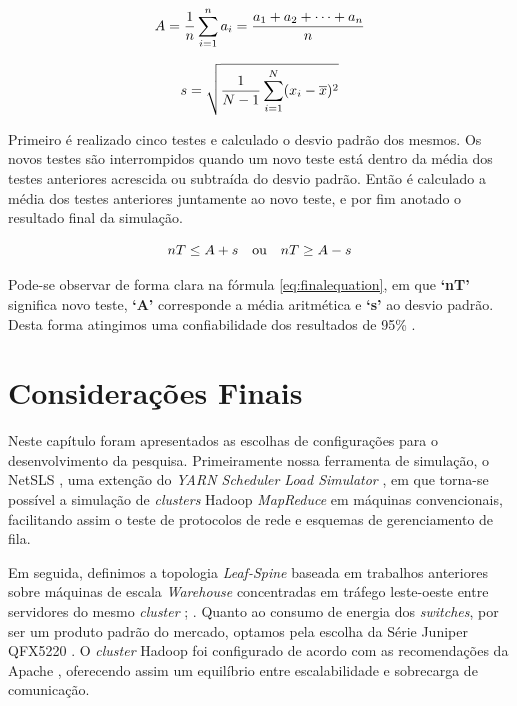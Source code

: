 \begin{equation}
\centering
{\displaystyle A={\frac {1}{n}}\sum _{i=1}^{n}a_{i}={\frac {a_{1}+a_{2}+\cdots +a_{n}}{n}}}
\label{eq:arithmeticmean}
\end{equation}

\begin{equation}
\centering
s = \sqrt{\frac{1}{N-1} \sum_{i=1}^N (x_i - \overline{x})^2}
\label{eq:standard_deviation}
\end{equation}

Primeiro é realizado cinco testes e calculado o desvio padrão dos mesmos. Os novos testes são interrompidos quando um novo teste está dentro da média dos testes anteriores acrescida ou subtraída do desvio padrão. Então é calculado a média dos testes anteriores juntamente ao novo teste, e por fim anotado o resultado final da simulação.

\begin{equation}
\centering
nT \leq A+s \quad \textrm{ou} \quad nT \geq A-s
\label{eq:finalequation}
\end{equation}

Pode-se observar de forma clara na fórmula \ref{eq:finalequation}, em que \textbf{`nT'} significa novo teste, \textbf{`A'} corresponde a média aritmética e \textbf{`s'} ao desvio padrão. Desta forma atingimos uma confiabilidade dos resultados de 95\% \cite{peck2015introduction}.

\section{Considerações Finais}

Neste capítulo foram apresentados as escolhas de configurações para o desenvolvimento da pesquisa. Primeiramente nossa ferramenta de simulação, o NetSLS \cite{wette2015extending}, uma extenção do \emph{YARN Scheduler Load Simulator} \cite{ApacheSLS}, em que torna-se possível a simulação de \emph{clusters} Hadoop \emph{MapReduce} em máquinas convencionais, facilitando assim o teste de protocolos de rede e esquemas de gerenciamento de fila.

Em seguida, definimos a topologia \emph{Leaf-Spine} \cite{CiscoLeafSpine} baseada em trabalhos anteriores sobre máquinas de escala \emph{Warehouse} concentradas em tráfego leste-oeste entre servidores do mesmo \emph{cluster} \cite{efficiency2012cisco}; \cite{IntroductionLeafSpine}. Quanto ao consumo de energia dos \emph{switches}, por ser um produto padrão do mercado, optamos pela escolha da Série Juniper QFX5220 \cite{QFX5220Guide}. O \emph{cluster} Hadoop foi configurado de acordo com as recomendações da Apache \cite{HDFSHighAvailability}, oferecendo assim um equilíbrio entre escalabilidade e sobrecarga de comunicação.

